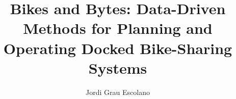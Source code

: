 
\title{Bikes and Bytes: Data-Driven Methods for Planning and Operating Docked Bike-Sharing Systems}


\author{Jordi Grau Escolano}

\dept{}

\university{}

